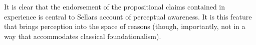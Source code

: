 \documentclass[12pt]{article}
\begin{document}
It is clear that the endorsement of the propositional claims contained in experience is central to Sellars account of perceptual awareness. It is this feature that brings perception into the space of reasons (though, importantly, not in a way that accommodates classical foundationalism). %
% 
% 
% 
\end{document}
